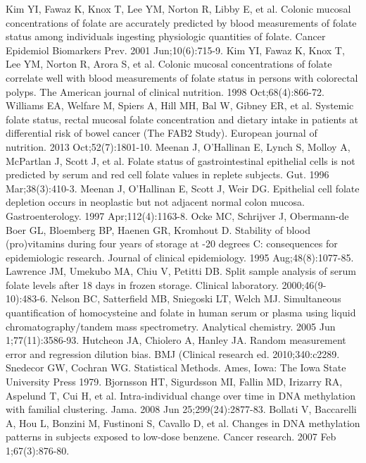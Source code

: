 \begin{thebibliography}{12}
		Kim YI, Fawaz K, Knox T, Lee YM, Norton R, Libby E, et al. Colonic mucosal concentrations of folate are accurately predicted by blood measurements of folate status among individuals ingesting physiologic quantities of folate. Cancer Epidemiol Biomarkers Prev. 2001 Jun;10(6):715-9.
		Kim YI, Fawaz K, Knox T, Lee YM, Norton R, Arora S, et al. Colonic mucosal concentrations of folate correlate well with blood measurements of folate status in persons with colorectal polyps. The American journal of clinical nutrition. 1998 Oct;68(4):866-72.
		Williams EA, Welfare M, Spiers A, Hill MH, Bal W, Gibney ER, et al. Systemic folate status, rectal mucosal folate concentration and dietary intake in patients at differential risk of bowel cancer (The FAB2 Study). European journal of nutrition. 2013 Oct;52(7):1801-10.
		Meenan J, O'Hallinan E, Lynch S, Molloy A, McPartlan J, Scott J, et al. Folate status of gastrointestinal epithelial cells is not predicted by serum and red cell folate values in replete subjects. Gut. 1996 Mar;38(3):410-3.
		Meenan J, O'Hallinan E, Scott J, Weir DG. Epithelial cell folate depletion occurs in neoplastic but not adjacent normal colon mucosa. Gastroenterology. 1997 Apr;112(4):1163-8.
		Ocke MC, Schrijver J, Obermann-de Boer GL, Bloemberg BP, Haenen GR, Kromhout D. Stability of blood (pro)vitamins during four years of storage at -20 degrees C: consequences for epidemiologic research. Journal of clinical epidemiology. 1995 Aug;48(8):1077-85.
		Lawrence JM, Umekubo MA, Chiu V, Petitti DB. Split sample analysis of serum folate levels after 18 days in frozen storage. Clinical laboratory. 2000;46(9-10):483-6.
		Nelson BC, Satterfield MB, Sniegoski LT, Welch MJ. Simultaneous quantification of homocysteine and folate in human serum or plasma using liquid chromatography/tandem mass spectrometry. Analytical chemistry. 2005 Jun 1;77(11):3586-93.
		Hutcheon JA, Chiolero A, Hanley JA. Random measurement error and regression dilution bias. BMJ (Clinical research ed. 2010;340:c2289.
		Snedecor GW, Cochran WG. Statistical Methods. Ames, Iowa: The Iowa State University Press 1979.
		Bjornsson HT, Sigurdsson MI, Fallin MD, Irizarry RA, Aspelund T, Cui H, et al. Intra-individual change over time in DNA methylation with familial clustering. Jama. 2008 Jun 25;299(24):2877-83.
		Bollati V, Baccarelli A, Hou L, Bonzini M, Fustinoni S, Cavallo D, et al. Changes in DNA methylation patterns in subjects exposed to low-dose benzene. Cancer research. 2007 Feb 1;67(3):876-80.

\end{thebibliography}

